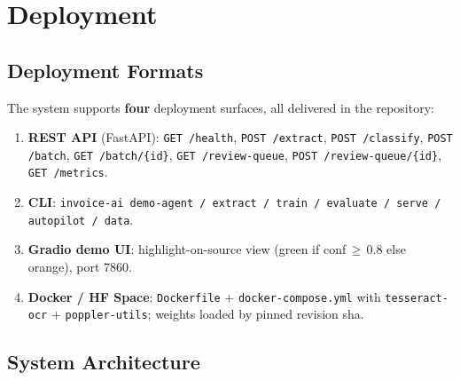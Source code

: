 \documentclass[12pt,a4paper]{article}
\begin{document}
\section{Deployment}

\subsection{Deployment Formats}

The system supports \textbf{four} deployment surfaces, all delivered in the repository:
\begin{enumerate}
  \item \textbf{REST API} (FastAPI): \texttt{GET /health}, \texttt{POST /extract}, \texttt{POST /classify}, \texttt{POST /batch}, \texttt{GET /batch/\{id\}}, \texttt{GET /review-queue}, \texttt{POST /review-queue/\{id\}}, \texttt{GET /metrics}.
  \item \textbf{CLI}: \texttt{invoice-ai demo-agent / extract / train / evaluate / serve / autopilot / data}.
  \item \textbf{Gradio demo UI}: highlight-on-source view (green if conf\,$\geq$\,0.8 else orange), port 7860.
  \item \textbf{Docker / HF Space}: \texttt{Dockerfile} + \texttt{docker-compose.yml} with \texttt{tesseract-ocr} + \texttt{poppler-utils}; weights loaded by pinned revision sha.
\end{enumerate}

\subsection{System Architecture}
\end{document}
